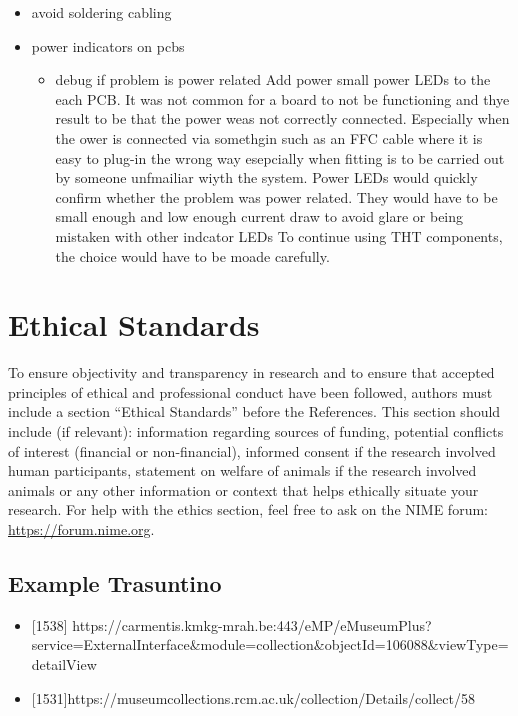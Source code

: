 \begin{itemize}
\item
  avoid soldering cabling
\item
  power indicators on pcbs

  \begin{itemize}
  \item
    debug if problem is power related Add power small power LEDs to the
    each PCB. It was not common for a board to not be functioning and
    thye result to be that the power weas not correctly connected.
    Especially when the ower is connected via somethgin such as an FFC
    cable where it is easy to plug-in the wrong way esepcially when
    fitting is to be carried out by someone unfmailiar wiyth the system.
    Power LEDs would quickly confirm whether the problem was power
    related. They would have to be small enough and low enough current
    draw to avoid glare or being mistaken with other indcator LEDs To
    continue using THT components, the choice would have to be moade
    carefully.
  \end{itemize}
\end{itemize}

\section{Ethical Standards}\label{ethical-standards}

To ensure objectivity and transparency in research and to ensure that
accepted principles of ethical and professional conduct have been
followed, authors must include a section ``Ethical Standards'' before
the References. This section should include (if relevant): information
regarding sources of funding, potential conflicts of interest (financial
or non-financial), informed consent if the research involved human
participants, statement on welfare of animals if the research involved
animals or any other information or context that helps ethically situate
your research. For help with the ethics section, feel free to ask on the
NIME forum: \url{https://forum.nime.org}.

\subsection{Example Trasuntino}\label{example-trasuntino}

\begin{itemize}
\item
  {[}1538{]}
  https://carmentis.kmkg-mrah.be:443/eMP/eMuseumPlus?service=ExternalInterface\&module=collection\&objectId=106088\&viewType=detailView
\item
  {[}1531{]}https://museumcollections.rcm.ac.uk/collection/Details/collect/58
\end{itemize}
